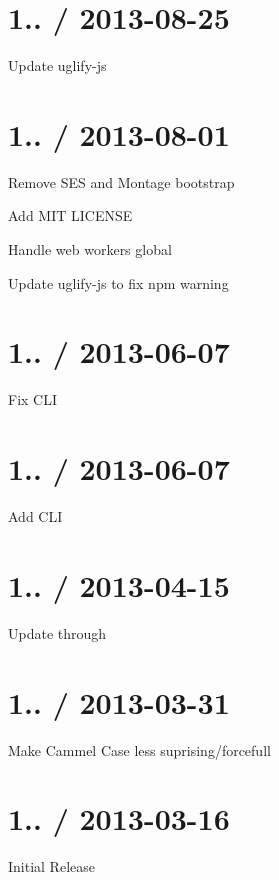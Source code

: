 \section*{1.. / 2013-\/08-\/25 }


\begin{DoxyItemize}
\item Update uglify-\/js
\end{DoxyItemize}

\section*{1.. / 2013-\/08-\/01 }


\begin{DoxyItemize}
\item Remove S\+ES and Montage bootstrap
\item Add M\+IT L\+I\+C\+E\+N\+SE
\item Handle web workers global
\item Update uglify-\/js to fix npm warning
\end{DoxyItemize}

\section*{1.. / 2013-\/06-\/07 }


\begin{DoxyItemize}
\item Fix C\+LI
\end{DoxyItemize}

\section*{1.. / 2013-\/06-\/07 }


\begin{DoxyItemize}
\item Add C\+LI
\end{DoxyItemize}

\section*{1.. / 2013-\/04-\/15 }


\begin{DoxyItemize}
\item Update through
\end{DoxyItemize}

\section*{1.. / 2013-\/03-\/31 }


\begin{DoxyItemize}
\item Make Cammel Case less suprising/forcefull
\end{DoxyItemize}

\section*{1.. / 2013-\/03-\/16 }


\begin{DoxyItemize}
\item Initial Release 
\end{DoxyItemize}